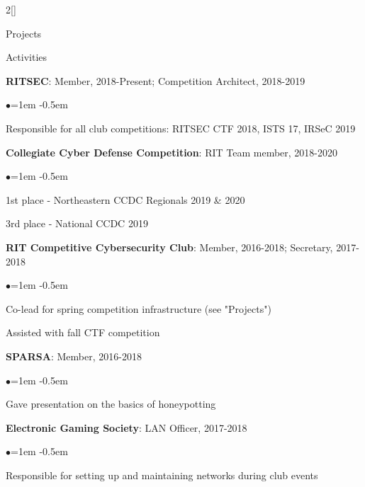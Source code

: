 \documentclass[8pt]{resume} %
\begin{document}
\begin{multicols}{2}[]
\begin{rSection}{Projects}
\end{rSection}

\columnbreak


\begin{rSection}{Activities}

    {\bf RITSEC}: Member, 2018-Present; Competition Architect, 2018-2019
    \begin{list}{$\bullet$}{\leftmargin=1em}
    \itemsep -0.5em \vspace{-0.5em}
    \item Responsible for all club competitions: RITSEC CTF 2018, ISTS 17,
        IRSeC 2019
    \end{list}

    {\bf Collegiate Cyber Defense Competition}: RIT Team member, 2018-2020
    \begin{list}{$\bullet$}{\leftmargin=1em}
    \itemsep -0.5em \vspace{-0.5em}
    \item 1st place - Northeastern CCDC Regionals 2019 \& 2020
    \item 3rd place - National CCDC 2019
    \end{list}

    {\bf RIT Competitive Cybersecurity Club}: Member, 2016-2018; Secretary,
    2017-2018
    \begin{list}{$\bullet$}{\leftmargin=1em}
    \itemsep -0.5em \vspace{-0.5em}
    \item Co-lead for spring competition infrastructure (see "Projects")
    \item Assisted with fall CTF competition
    \end{list}

    {\bf SPARSA}: Member, 2016-2018
    \begin{list}{$\bullet$}{\leftmargin=1em}
    \itemsep -0.5em \vspace{-0.5em}
    \item Gave presentation on the basics of honeypotting
    \end{list}

    {\bf Electronic Gaming Society}: LAN Officer, 2017-2018
    \begin{list}{$\bullet$}{\leftmargin=1em}
    \itemsep -0.5em \vspace{-0.5em}
    \item Responsible for setting up and maintaining networks during club
        events
    \end{list}

\end{rSection}


\end{multicols}
\end{document}
